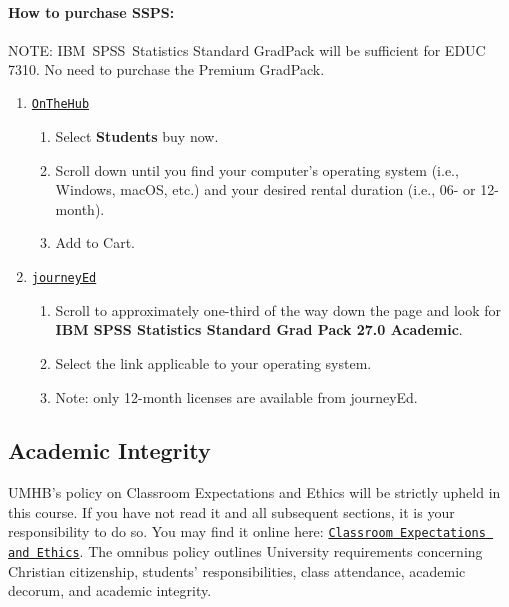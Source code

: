 \documentclass[
]{article}
\providecommand{\tightlist}{%
  \setlength{\itemsep}{0pt}\setlength{\parskip}{0pt}}
\begin{document}
\textbf{How to purchase SSPS:}

\begin{tcolorbox}
[width=\linewidth, sharp corners=all, colback=white!95!red]
NOTE: IBM\textsuperscript{\textregistered}\ SPSS\textsuperscript{\textregistered}\ Statistics Standard GradPack will be sufficient for EDUC 7310. No need to purchase the Premium GradPack.
\end{tcolorbox}

\begin{enumerate}
\def\labelenumi{\arabic{enumi}.}
\tightlist
\item
  \texttt{\href{https://onthehub.com/spss/}{OnTheHub}}

  \begin{enumerate}
  \def\labelenumii{\arabic{enumii}.}
  \tightlist
  \item
    Select \textbf{Students} buy now.
  \item
    Scroll down until you find your computer's operating system (i.e.,
    Windows, macOS, etc.) and your desired rental duration (i.e., 06- or
    12-month).
  \item
    Add to Cart.
  \end{enumerate}
\item
  \texttt{\href{https://www.journeyed.com/products/IBM+SPSS/IBM+SPSS+Statistics}{journeyEd}}

  \begin{enumerate}
  \def\labelenumii{\arabic{enumii}.}
  \tightlist
  \item
    Scroll to approximately one-third of the way down the page and look
    for \textbf{IBM SPSS Statistics Standard Grad Pack 27.0 Academic}.
  \item
    Select the link applicable to your operating system.
  \item
    Note: only 12-month licenses are available from journeyEd.
  \end{enumerate}
\end{enumerate}

\subsection{Academic Integrity}

UMHB's policy on Classroom Expectations and Ethics will be strictly
upheld in this course. If you have not read it and all subsequent
sections, it is your responsibility to do so. You may find it online
here:
\href{http://catalog.umhb.edu/2019-2020/Graduate-Catalog/Classroom-Expectations-and-Ethics}{\texttt{Classroom Expectations and Ethics}}.
The omnibus policy outlines University requirements concerning Christian
citizenship, students' responsibilities, class attendance, academic
decorum, and academic integrity.
\end{document}
